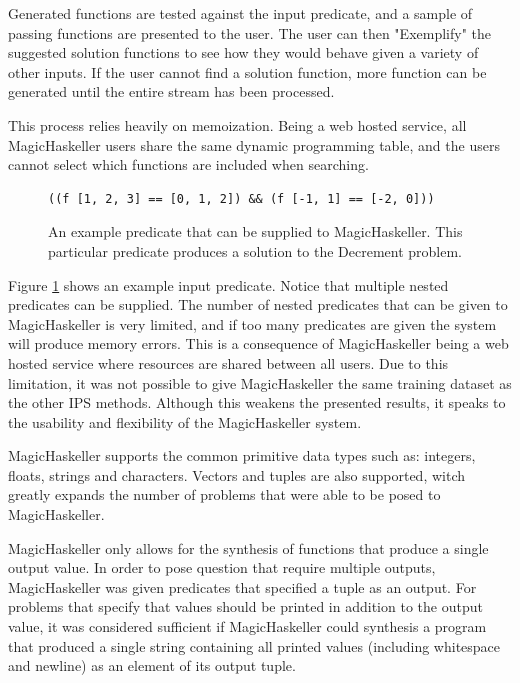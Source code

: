 Generated functions are tested against the input predicate, and a sample of passing functions are presented to the user. The user can then "Exemplify" the suggested solution functions to see how they would behave given a variety of other inputs. If the user cannot find a solution function, more function can be generated until the entire stream has been processed.

This process relies heavily on memoization. Being a web hosted service, all MagicHaskeller users share the same dynamic programming table, and the users cannot select which functions are included when searching.

\begin{figure}
\begin{verbatim}
((f [1, 2, 3] == [0, 1, 2]) && (f [-1, 1] == [-2, 0]))  
\end{verbatim}
\caption{An example predicate that can be supplied to MagicHaskeller. This particular predicate produces a solution to the Decrement problem.}
\label{fig:MHpred}
\end{figure}

Figure \ref{fig:MHpred} shows an example input predicate. Notice that multiple nested predicates can be supplied. The number of nested predicates that can be given to MagicHaskeller is very limited, and if too many predicates are given the system will produce memory errors. This is a consequence of MagicHaskeller being a web hosted service where resources are shared between all users. Due to this limitation, it was not possible to give MagicHaskeller the same training dataset as the other IPS methods. Although this weakens the presented results, it speaks to the usability and flexibility of the MagicHaskeller system.

MagicHaskeller supports the common primitive data types such as: integers, floats, strings and characters. Vectors and tuples are also supported, witch greatly expands the number of problems that were able to be posed to MagicHaskeller.

MagicHaskeller only allows for the synthesis of functions that produce a single output value. In order to pose question that require multiple outputs, MagicHaskeller was given predicates that specified a tuple as an output. For problems that specify that values should be printed in addition to the output value, it was considered sufficient if MagicHaskeller could synthesis a program that produced a single string containing all printed values (including whitespace and newline) as an element of its output tuple.

